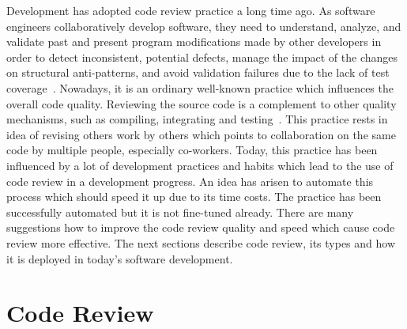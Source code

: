 Development has adopted code review practice a long time ago. As software engineers collaboratively develop software, they need to understand, analyze, and validate past and present program modifications made by other developers in order to detect inconsistent, potential defects, manage the impact of the changes on structural anti-patterns, and avoid validation failures due to the lack of test coverage~\cite{CodeReview_bug_and_refactor}. Nowadays, it is an ordinary well-known practice which influences the overall code quality. Reviewing the source code is a complement to other quality mechanisms, such as compiling, integrating and testing~\cite{CodeReview_types}. This practice rests in idea of revising others work by others which points to collaboration on the same code by multiple people, especially co-workers. Today, this practice has been influenced by a lot of development practices and habits which lead to the use of code review in a development progress. An idea has arisen to automate this process which should speed it up due to its time costs. The practice has been successfully automated but it is not fine-tuned already. There are many suggestions how to improve the code review quality and speed which cause code review more effective. The next sections describe code review, its types and how it is deployed in today's software development.

\section{Code Review}

